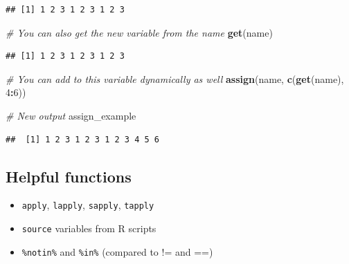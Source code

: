 \documentclass[
  openany]{book}
\newenvironment{Shaded}{\begin{snugshade}}{\end{snugshade}}
\newcommand{\CommentTok}[1]{\textcolor[rgb]{0.56,0.35,0.01}{\textit{#1}}}
\newcommand{\DecValTok}[1]{\textcolor[rgb]{0.00,0.00,0.81}{#1}}
\newcommand{\KeywordTok}[1]{\textcolor[rgb]{0.13,0.29,0.53}{\textbf{#1}}}
\newcommand{\NormalTok}[1]{#1}
\newcommand{\OperatorTok}[1]{\textcolor[rgb]{0.81,0.36,0.00}{\textbf{#1}}}
\providecommand{\tightlist}{%
  \setlength{\itemsep}{0pt}\setlength{\parskip}{0pt}}
\begin{document}
\begin{verbatim}
## [1] 1 2 3 1 2 3 1 2 3
\end{verbatim}

\begin{Shaded}
\begin{Highlighting}[]
\CommentTok{# You can also get the new variable from the name}
\KeywordTok{get}\NormalTok{(name)}
\end{Highlighting}
\end{Shaded}

\begin{verbatim}
## [1] 1 2 3 1 2 3 1 2 3
\end{verbatim}

\begin{Shaded}
\begin{Highlighting}[]
\CommentTok{# You can add to this variable dynamically as well}
\KeywordTok{assign}\NormalTok{(name, }\KeywordTok{c}\NormalTok{(}\KeywordTok{get}\NormalTok{(name), }\DecValTok{4}\OperatorTok{:}\DecValTok{6}\NormalTok{))}

\CommentTok{# New output}
\NormalTok{assign_example}
\end{Highlighting}
\end{Shaded}

\begin{verbatim}
##  [1] 1 2 3 1 2 3 1 2 3 4 5 6
\end{verbatim}

\hypertarget{helpful-functions}{%
\subsection{Helpful functions}\label{helpful-functions}}

\begin{itemize}
\tightlist
\item
  \texttt{apply}, \texttt{lapply}, \texttt{sapply}, \texttt{tapply}
\item
  \texttt{source} variables from R scripts
\item
  \texttt{\%notin\%} and \texttt{\%in\%} (compared to != and ==)
\end{itemize}
\end{document}
